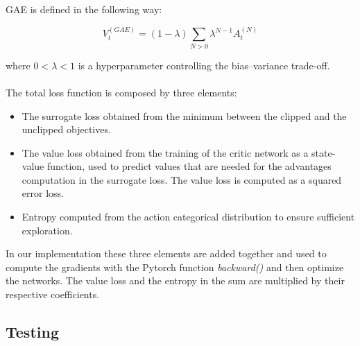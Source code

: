 \documentclass[11pt, a4paper, hidelinks]{report}
\begin{document}
GAE is defined in the following way:

\begin{equation}
	V_t^{(GAE)} = (1 - \lambda)\sum_{N > 0} \lambda^{N - 1}A_t^{(N)}\label{eq:GAE}
\end{equation}

where $0 < \lambda < 1$ is a hyperparameter controlling the bias–variance trade-off.
\\
\\
The total loss function is composed by three elements:
\begin{itemize}
	\item The surrogate loss obtained from the minimum between the clipped and the unclipped objectives.
	\item The value loss obtained from the training of the critic network as a state-value function, used to predict values that are needed for the advantages computation in the surrogate loss.
The value loss is computed as a squared error loss. %
	\item Entropy computed from the action categorical distribution to ensure sufficient exploration.
\end{itemize}

In our implementation these three elements are added together and used to compute the gradients with the Pytorch function \textit{backward()} and then optimize the networks.
The value loss and the entropy in the sum are multiplied by their respective coefficients.


\subsection{Testing}\label{subsec:testing}
\end{document}
